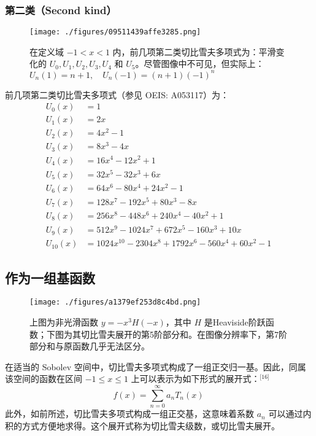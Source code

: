 \subsubsection{第二类（Second kind）}
\begin{figure}[ht]
\centering
\texttt{[image: ./figures/09511439affe3285.png]}
\caption{在定义域 $-1 < x < 1$ 内，前几项第二类切比雪夫多项式为：平滑变化的 $U_0, U_1, U_2, U_3, U_4$ 和 $U_5$。尽管图像中不可见，但实际上：$U_n(1) = n + 1,\quad U_n(-1) = (n + 1)(-1)^n$} \label{fig_QBXFdx_4}
\end{figure}
前几项第二类切比雪夫多项式（参见 OEIS: A053117）为：
$$
\begin{aligned}
U_0(x) &= 1 \\
U_1(x) &= 2x \\
U_2(x) &= 4x^2 - 1 \\
U_3(x) &= 8x^3 - 4x \\
U_4(x) &= 16x^4 - 12x^2 + 1 \\
U_5(x) &= 32x^5 - 32x^3 + 6x \\
U_6(x) &= 64x^6 - 80x^4 + 24x^2 - 1 \\
U_7(x) &= 128x^7 - 192x^5 + 80x^3 - 8x \\
U_8(x) &= 256x^8 - 448x^6 + 240x^4 - 40x^2 + 1 \\
U_9(x) &= 512x^9 - 1024x^7 + 672x^5 - 160x^3 + 10x \\
U_{10}(x) &= 1024x^{10} - 2304x^8 + 1792x^6 - 560x^4 + 60x^2 - 1
\end{aligned}~
$$
\subsection{作为一组基函数}
\begin{figure}[ht]
\centering
\texttt{[image: ./figures/a1379ef253d8c4bd.png]}
\caption{上图为非光滑函数 $y = -x^3 H(-x)$，其中 $H$ 是Heaviside阶跃函数；下图为其切比雪夫展开的第5阶部分和。在图像分辨率下，第7阶部分和与原函数几乎无法区分。} \label{fig_QBXFdx_5}
\end{figure}
在适当的 Sobolev 空间中，切比雪夫多项式构成了一组正交归一基。因此，同属该空间的函数在区间 $-1 \leq x \leq 1$ 上可以表示为如下形式的展开式：\(^\text{[16]}\)
$$
f(x) = \sum_{n=0}^{\infty} a_n T_n(x)~
$$
此外，如前所述，切比雪夫多项式构成一组正交基，这意味着系数 $a_n$ 可以通过内积的方式方便地求得。这个展开式称为切比雪夫级数，或切比雪夫展开。

